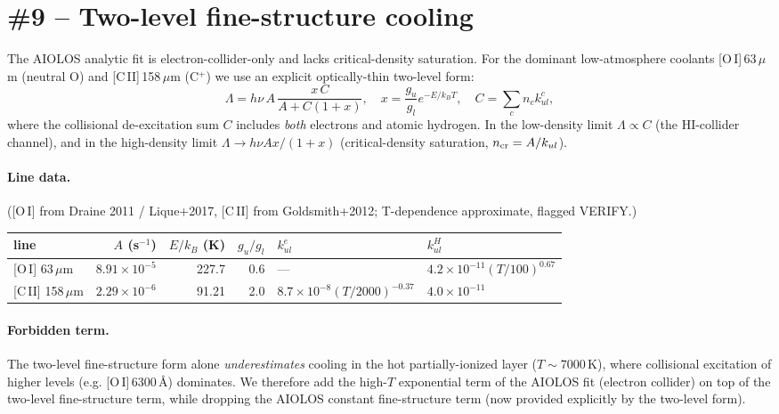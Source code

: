 \documentclass[english,a4paper]{my_memo}
\begin{document}
\section{\#9 -- Two-level fine-structure cooling}

The AIOLOS analytic fit is electron-collider-only and lacks
critical-density saturation.  For the dominant low-atmosphere coolants
[O\,I]\,63\,$\mu$m (neutral O) and [C\,II]\,158\,$\mu$m (C$^+$) we use an
explicit optically-thin two-level form:
\[
  \Lambda = h\nu\,A\,\frac{x\,C}{A + C(1+x)},\quad
  x = \frac{g_u}{g_l}e^{-E/k_BT},\quad
  C = \sum_c n_c k_{ul}^c,
\]
where the collisional de-excitation sum $C$ includes \emph{both}
electrons and atomic hydrogen.  In the low-density limit $\Lambda \propto
C$ (the HI-collider channel), and in the high-density limit
$\Lambda \to h\nu A x/(1+x)$ (critical-density saturation,
$n_{\rm cr} = A/k_{ul}$).

\paragraph{Line data.} ([O\,I] from Draine 2011 / Lique+2017,
[C\,II] from Goldsmith+2012; T-dependence approximate, flagged VERIFY.)
\begin{center}
\begin{tabular}{lrrrll}
\toprule
line & $A$ (s$^{-1}$) & $E/k_B$ (K) & $g_u/g_l$ & $k^e_{ul}$ & $k^H_{ul}$ \\
\midrule
{}[O\,I] 63\,$\mu$m  & $8.91\!\times\!10^{-5}$ & 227.7 & 0.6 & --- & $4.2\!\times\!10^{-11}(T/100)^{0.67}$ \\
{}[C\,II] 158\,$\mu$m & $2.29\!\times\!10^{-6}$ & 91.21 & 2.0 & $8.7\!\times\!10^{-8}(T/2000)^{-0.37}$ & $4.0\!\times\!10^{-11}$ \\
\bottomrule
\end{tabular}
\end{center}

\paragraph{Forbidden term.} The two-level fine-structure form alone
\emph{underestimates} cooling in the hot partially-ionized layer
($T\sim7000$\,K), where collisional excitation of higher levels (e.g.
[O\,I]\,6300\,\AA) dominates.  We therefore add the high-$T$ exponential
term of the AIOLOS fit (electron collider) on top of the two-level
fine-structure term, while dropping the AIOLOS constant fine-structure
term (now provided explicitly by the two-level form).
\end{document}
